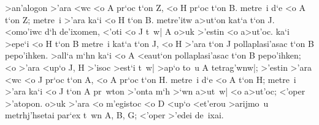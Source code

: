 \begin{Parallel}{}{}
{{>an'alogon >'ara <wc <o A pr`oc t`on Z, <o H pr`oc t`on  B.  metre~i d`e <o
A t`on Z; metre~i >'ara ka`i <o H t`on B. metre'itw
a>ut`on kat`a t`on J. <omo'iwc d`h
de'ixomen, <'oti <o J t~w| A o>uk >'estin
<o a>ut'oc. ka`i >epe`i <o H t`on B metre~i kat`a t`on J,  <o H >'ara t`on
J pollaplasi'asac t`on B pepo'ihken. >all`a m`hn ka`i <o A <eaut`on pollaplasi'asac t`on B pepo'ihken; <o >'ara <up`o J, H >'isoc >est`i t~w|
>ap`o to~u A tetrag'wnw|;  >'estin >'ara <wc <o J pr`oc t`on A, <o A
pr`oc t`on H. metre~i d`e <o A t`on H; metre~i >'ara ka`i <o J t`on A
pr~wton >'onta m`h >`wn a>ut~w| <o a>ut'oc; <'oper >'atopon.
o>uk >'ara <o m'egistoc <o D <up`o <et'erou >arijmo~u metrhj'hsetai
par`ex t~wn A, B, G; <'oper >'edei de~ixai.}}

\end{Parallel}
